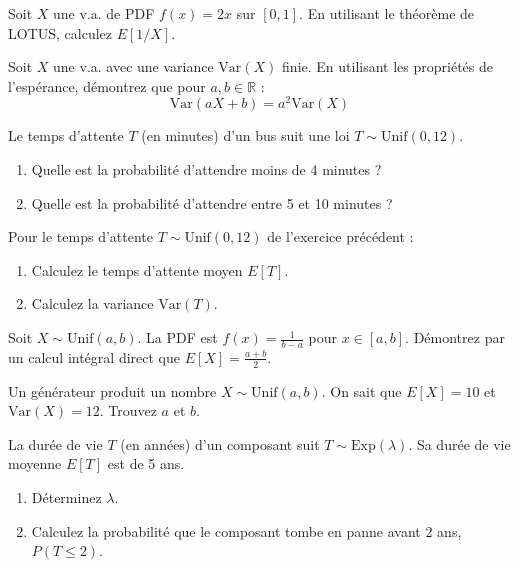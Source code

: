 \begin{exercicebox}[Exercice 6 :]
Soit $X$ une v.a. de PDF $f(x) = 2x$ sur $[0, 1]$. En utilisant le théorème de LOTUS, calculez $E[1/X]$.
\end{exercicebox}

\begin{exercicebox}
Soit $X$ une v.a. avec une variance $\text{Var}(X)$ finie. En utilisant les propriétés de l'espérance, démontrez que pour $a, b \in \mathbb{R}$ :
$$ \text{Var}(aX + b) = a^2 \text{Var}(X) $$
\end{exercicebox}

\begin{exercicebox}[Exercice 8 :]
Le temps d'attente $T$ (en minutes) d'un bus suit une loi $T \sim \text{Unif}(0, 12)$.
\begin{enumerate}
    \item Quelle est la probabilité d'attendre moins de 4 minutes ?
    \item Quelle est la probabilité d'attendre entre 5 et 10 minutes ?
\end{enumerate}
\end{exercicebox}

\begin{exercicebox}[Exercice 9 :]
Pour le temps d'attente $T \sim \text{Unif}(0, 12)$ de l'exercice précédent :
\begin{enumerate}
    \item Calculez le temps d'attente moyen $E[T]$.
    \item Calculez la variance $\text{Var}(T)$.
\end{enumerate}
\end{exercicebox}

\begin{exercicebox}[Exercice 10 :]
Soit $X \sim \text{Unif}(a, b)$. La PDF est $f(x) = \frac{1}{b-a}$ pour $x \in [a, b]$.
Démontrez par un calcul intégral direct que $E[X] = \frac{a+b}{2}$.
\end{exercicebox}

\begin{exercicebox}[Exercice 11 :]
Un générateur produit un nombre $X \sim \text{Unif}(a, b)$. On sait que $E[X] = 10$ et $\text{Var}(X) = 12$. Trouvez $a$ et $b$.
\end{exercicebox}

\begin{exercicebox}[Exercice 12 :]
La durée de vie $T$ (en années) d'un composant suit $T \sim \text{Exp}(\lambda)$. Sa durée de vie moyenne $E[T]$ est de 5 ans.
\begin{enumerate}
    \item Déterminez $\lambda$.
    \item Calculez la probabilité que le composant tombe en panne avant 2 ans, $P(T \le 2)$.
\end{enumerate}
\end{exercicebox}

